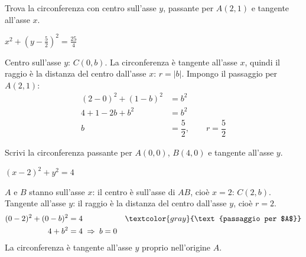 
\begin{question}[ID=2.10, subtitle={Circonferenza con centro sull'asse $y$ tangente all'asse $x$}, difficulty=media, tags={circonferenza}]
Trova la circonferenza con centro sull'asse $y$, passante per $A(2,1)$ e tangente all'asse $x$.
\begin{solution}
$x^2+\left(y-\tfrac52\right)^2=\tfrac{25}{4}$
\end{solution}
\begin{explanation}
Centro sull'asse $y$: $C(0,b)$. La circonferenza è tangente all'asse $x$, quindi il raggio è la distanza del centro dall'asse $x$: $r=|b|$. Impongo il passaggio per $A(2,1)$:
\[\begin{aligned}
(2-0)^2+(1-b)^2 &= b^2\\
4+1-2b+b^2 &= b^2\\
b &= \dfrac52, \qquad r=\dfrac52
\end{aligned}\]
\end{explanation}
\end{question}


\begin{question}[ID=2.11, subtitle={Circonferenza per $A(0,0)$ e $B(4,0)$ tangente all'asse $y$}, difficulty=media, tags={circonferenza}]
Scrivi la circonferenza passante per $A(0,0)$, $B(4,0)$ e tangente all'asse $y$.
\begin{solution}
$(x-2)^2+y^2=4$
\end{solution}
\begin{explanation}
$A$ e $B$ stanno sull'asse $x$: il centro è sull'asse di $AB$, cioè $x=2$: $C(2,b)$. \\
Tangente all'asse $y$: il raggio è la distanza del centro dall'asse $y$, cioè $r=2$.
\[\begin{aligned}
(0-2)^2+(0-b)^2 &= 4 && \textcolor{gray}{\text{passaggio per $A$}}\\
4+b^2 &= 4 \;\Rightarrow\; b=0
\end{aligned}\]
La circonferenza è tangente all'asse $y$ proprio nell'origine $A$.
\end{explanation}
\end{question}


